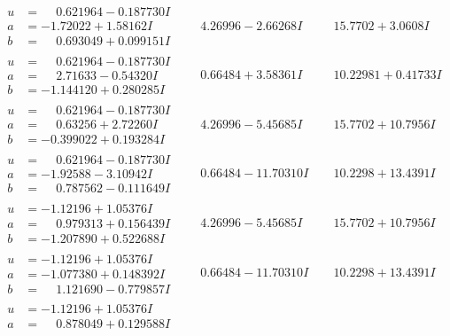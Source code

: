 \documentclass[1p]{elsarticle_modified}
\theoremstyle{definition}
\begin{document}
$$\begin{array}{c|c|c}
\begin{aligned}
u &= \phantom{-}0.621964 - 0.187730 I \\
a &= -1.72022 + 1.58162 I \\
b &= \phantom{-}0.693049 + 0.099151 I\end{aligned}
 & \phantom{-}4.26996 - 2.66268 I & \phantom{-}15.7702 + 3.0608 I \\ \hline\begin{aligned}
u &= \phantom{-}0.621964 - 0.187730 I \\
a &= \phantom{-}2.71633 - 0.54320 I \\
b &= -1.144120 + 0.280285 I\end{aligned}
 & \phantom{-}0.66484 + 3.58361 I & \phantom{-}10.22981 + 0.41733 I \\ \hline\begin{aligned}
u &= \phantom{-}0.621964 - 0.187730 I \\
a &= \phantom{-}0.63256 + 2.72260 I \\
b &= -0.399022 + 0.193284 I\end{aligned}
 & \phantom{-}4.26996 - 5.45685 I & \phantom{-}15.7702 + 10.7956 I \\ \hline\begin{aligned}
u &= \phantom{-}0.621964 - 0.187730 I \\
a &= -1.92588 - 3.10942 I \\
b &= \phantom{-}0.787562 - 0.111649 I\end{aligned}
 & \phantom{-}0.66484 - 11.70310 I & \phantom{-}10.2298 + 13.4391 I \\ \hline\begin{aligned}
u &= -1.12196 + 1.05376 I \\
a &= \phantom{-}0.979313 + 0.156439 I \\
b &= -1.207890 + 0.522688 I\end{aligned}
 & \phantom{-}4.26996 - 5.45685 I & \phantom{-}15.7702 + 10.7956 I \\ \hline\begin{aligned}
u &= -1.12196 + 1.05376 I \\
a &= -1.077380 + 0.148392 I \\
b &= \phantom{-}1.121690 - 0.779857 I\end{aligned}
 & \phantom{-}0.66484 - 11.70310 I & \phantom{-}10.2298 + 13.4391 I \\ \hline\begin{aligned}
u &= -1.12196 + 1.05376 I \\
a &= \phantom{-}0.878049 + 0.129588 I \\

\end{aligned}
\end{array}$$
\end{document}
